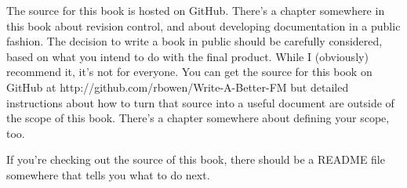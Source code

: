 The source for this book is hosted on GitHub. There's a chapter
somewhere in this book about revision control, and about developing
documentation in a public fashion. The decision to write a book in
public should be carefully considered, based on what you intend to do
with the final product. While I (obviously) recommend it, it's not for
everyone. You can get the source for this book on GitHub at
http://github.com/rbowen/Write-A-Better-FM but detailed instructions
about how to turn that source into a useful document are outside of the
scope of this book. There's a chapter somewhere about defining your
scope, too.

If you're checking out the source of this book, there should be a README
file somewhere that tells you what to do next.

